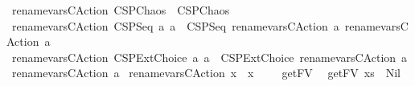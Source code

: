 \begin{isabellebody}
{\isacharbar}\ {\isachardoublequoteopen}rename{\isacharunderscore}vars{\isacharunderscore}CAction\ CSPChaos\ {\isacharequal}\ CSPChaos{\isachardoublequoteclose}\isanewline
{\isacharbar}\ {\isachardoublequoteopen}rename{\isacharunderscore}vars{\isacharunderscore}CAction\ {\isacharparenleft}CSPSeq\ a{}\ a{}{\isacharparenright}\ {\isacharequal}\ {\isacharparenleft}CSPSeq\ {\isacharparenleft}rename{\isacharunderscore}vars{\isacharunderscore}CAction\ a{}{\isacharparenright}\ {\isacharparenleft}rename{\isacharunderscore}vars{\isacharunderscore}CAction\ a{}{\isacharparenright}{\isacharparenright}{\isachardoublequoteclose}\isanewline
{\isacharbar}\ {\isachardoublequoteopen}rename{\isacharunderscore}vars{\isacharunderscore}CAction\ {\isacharparenleft}CSPExtChoice\ a{}\ a{}{\isacharparenright}\ {\isacharequal}\ {\isacharparenleft}CSPExtChoice\ {\isacharparenleft}rename{\isacharunderscore}vars{\isacharunderscore}CAction\ a{}{\isacharparenright}\ {\isacharparenleft}rename{\isacharunderscore}vars{\isacharunderscore}CAction\ a{}{\isacharparenright}{\isacharparenright}{\isachardoublequoteclose}\isanewline
{\isacharbar}\ {\isachardoublequoteopen}rename{\isacharunderscore}vars{\isacharunderscore}CAction\ x\ {\isacharequal}\ x{\isachardoublequoteclose}\isanewline
\isanewline
\ \isanewline
\ \isanewline
{}\isamarkupfalse%
\ getFV\isanewline
{}\isanewline
\ \ {\isachardoublequoteopen}getFV\ xs\ {\isacharequal}\ Nil{\isachardoublequoteclose}\isanewline
\isanewline
%
\isadelimtheory
\isanewline
%
\endisadelimtheory
%
\isatagtheory
{}\isamarkupfalse%
%
\endisatagtheory
{\isafoldtheory}%
%
\isadelimtheory
%
\endisadelimtheory
\end{isabellebody}%
